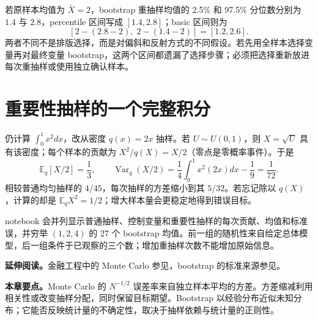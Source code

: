 \begin{example}
若原样本均值为 $\bar X=2$，bootstrap 重抽样均值的 2.5\% 和 97.5\% 分位数分别为 $1.4$ 与 $2.8$，percentile 区间写成 $[1.4,2.8]$；basic 区间则为
\[
 [2-(2.8-2),\;2-(1.4-2)]=[1.2,2.6].
\]
两者不同不是排版选择，而是对偏斜和反射方式的不同假设。若先用全样本选择变量再对最终变量 bootstrap，这两个区间都遗漏了选择步骤；必须把选择重新放进每次重抽样或使用独立确认样本。
\end{example}

\section{重要性抽样的一个完整积分}
仍计算 $\int_0^1x^2dx$，改从密度 $q(x)=2x$ 抽样。若 $U\sim U(0,1)$，则 $X=\sqrt U$ 具有该密度；每个样本的贡献为 $X^2/q(X)=X/2$（零点是零概率事件）。于是
\[
 \mathbb E_q[X/2]=\frac13,\qquad
 \operatorname{Var}_q(X/2)=\frac14\int_0^1x^2(2x)dx-\frac19=\frac1{72}.
\]
相较普通均匀抽样的 $4/45$，每次抽样的方差缩小到其 $5/32$。若忘记除以 $q(X)$，计算的却是 $\mathbb E_qX^2=1/2$；增大样本量会更稳定地得到错误目标。

notebook 会并列显示普通抽样、控制变量和重要性抽样的每次贡献、均值和标准误，并穷举 $(1,2,4)$ 的 27 个 bootstrap 均值。前一组的随机性来自给定总体模型，后一组条件于已观察的三个数；增加重抽样次数不能增加原始信息。

\noindent\textbf{延伸阅读。}金融工程中的 Monte Carlo 参见\cite{glasserman2004montecarlo}，bootstrap 的标准来源参见\cite{efron1993bootstrap}。




\noindent\textbf{本章要点。}Monte Carlo 的 $N^{-1/2}$ 误差率来自独立样本平均的方差。方差缩减利用相关性或改变抽样分配，同时保留目标期望。Bootstrap 以经验分布近似未知分布；它能否反映统计量的不确定性，取决于抽样依赖与统计量的正则性。